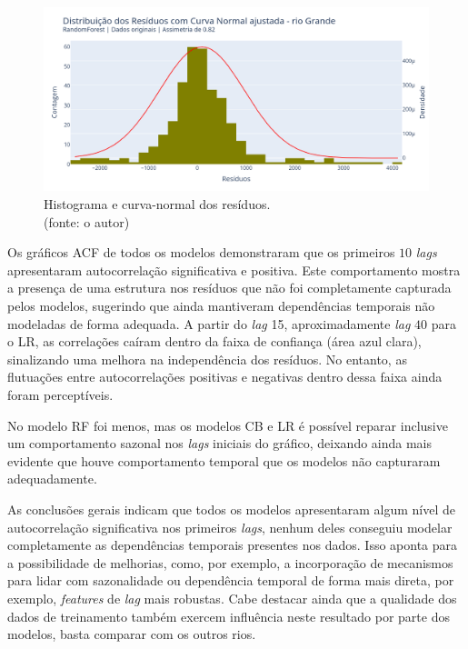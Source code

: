 \begin{figure}[!h]
\centering
\includegraphics[scale=0.33]{Figuras/rio_grande/wfv/RF/RF_WFV_ORIG_RESID_x_CURVA_NORMAL.png}
\caption{Histograma e curva-normal dos resíduos.\\(fonte: o autor)}
\label{fig:grande_RF_WFV_ORIG_RESID_x_CURVA_NORMAL}
\end{figure}
\clearpage

Os gráficos ACF de todos os modelos demonstraram que os primeiros $10$ \textit{lags} apresentaram autocorrelação significativa e positiva. Este comportamento mostra a presença de uma estrutura nos resíduos que não foi completamente capturada pelos modelos, sugerindo que ainda mantiveram dependências temporais não modeladas de forma adequada. A partir do \textit{lag} 15, aproximadamente \textit{lag} $40$ para o LR, as correlações caíram dentro da faixa de confiança (área azul clara), sinalizando uma melhora na independência dos resíduos. No entanto, as flutuações entre autocorrelações positivas e negativas dentro dessa faixa ainda foram perceptíveis.

No modelo RF foi menos, mas os modelos CB e LR é possível reparar inclusive um comportamento sazonal nos \textit{lags} iniciais do gráfico, deixando ainda mais evidente que houve comportamento temporal que os modelos não capturaram adequadamente.

As conclusões gerais indicam que todos os modelos apresentaram algum nível de autocorrelação significativa nos primeiros \textit{lags}, nenhum deles conseguiu modelar completamente as dependências temporais presentes nos dados. Isso aponta para a possibilidade de melhorias, como, por exemplo, a incorporação de mecanismos para lidar com sazonalidade ou dependência temporal de forma mais direta, por exemplo, \textit{features} de \textit{lag} mais robustas. Cabe destacar ainda que a qualidade dos dados de treinamento também exercem influência neste resultado por parte dos modelos, basta comparar com os outros rios.

